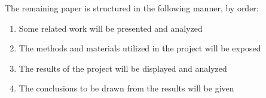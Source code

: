 The remaining paper is structured in the following manner, by order:

\begin{enumerate}
    \item Some related work will be presented and analyzed
    \item The methods and materials utilized in the project will be exposed
    \item The results of the project will be displayed and analyzed
    \item The conclusions to be drawn from the results will be given
\end{enumerate}